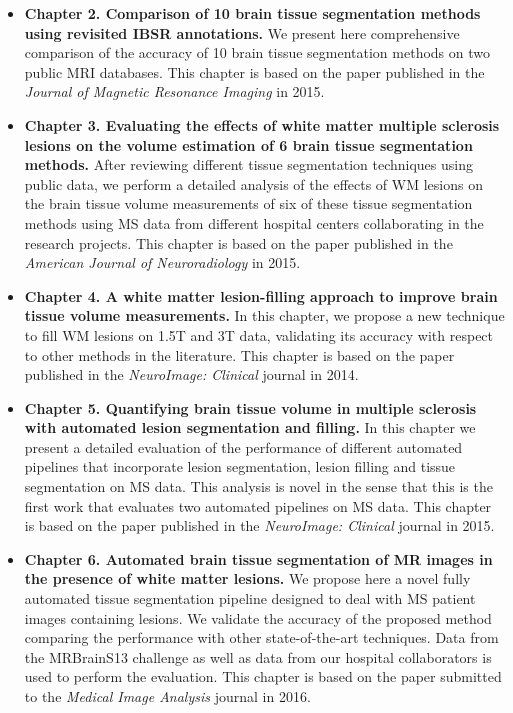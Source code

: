 \begin{itemize}
\item \textbf{Chapter 2. Comparison of 10 brain tissue segmentation methods using revisited IBSR annotations.}  We present here comprehensive comparison of the accuracy of 10 brain tissue segmentation methods on two public MRI databases. This chapter is based on the paper published in  the\textit{ Journal of Magnetic Resonance Imaging} in 2015. 

\item \textbf{Chapter 3. Evaluating the effects of white matter multiple sclerosis lesions on the volume estimation of 6 brain tissue segmentation methods.} After reviewing different tissue segmentation techniques using public data, we perform a detailed analysis of the effects of WM lesions on the brain tissue volume measurements of six of these tissue segmentation methods using MS data from different hospital centers collaborating in the research projects. This chapter is based on the paper published in  the \textit{American Journal of Neuroradiology} in 2015. 

\item \textbf{Chapter 4. A white matter lesion-filling approach to improve brain tissue volume measurements.} In this chapter, we propose a new technique to fill WM lesions on 1.5T and 3T data, validating its accuracy with respect to other methods in the literature. This chapter is based on the paper published in the \textit{NeuroImage: Clinical} journal in 2014. 

\item \textbf{Chapter 5. Quantifying brain tissue volume in multiple sclerosis with automated lesion segmentation and filling.} In this chapter we present a detailed  evaluation of the performance of different automated pipelines that incorporate lesion segmentation, lesion filling and tissue segmentation on MS data. This analysis is novel in the sense that this is the first work that evaluates two automated pipelines on MS data. This chapter is based on the paper published in the \textit{NeuroImage: Clinical} journal in 2015.

\item \textbf{Chapter 6. Automated brain tissue segmentation of MR images in the presence of white matter lesions.} We propose here a novel fully automated tissue segmentation pipeline designed to deal with MS patient images containing lesions. We validate the accuracy of the proposed method comparing the performance with other state-of-the-art techniques. Data from the MRBrainS13 challenge as well as data from our hospital collaborators is used to perform the evaluation. This chapter is based on the paper submitted to the \textit{Medical Image Analysis} journal in 2016.  


\end{itemize}
